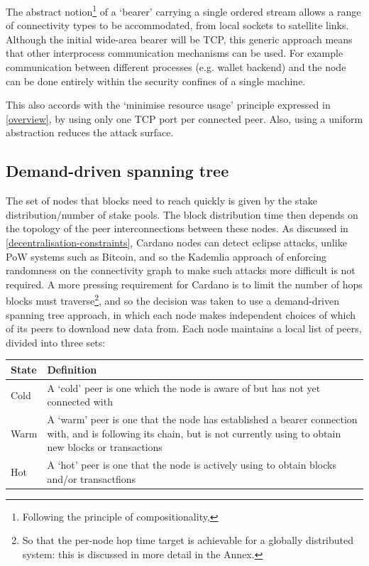\documentclass[11pt,a4paper]{article}
\begin{document}
The abstract notion\footnote{Following the principle of
  compositionality,} of a `bearer' carrying a single ordered stream
allows a range of connectivity types to be accommodated, from local
sockets to satellite links. Although the initial wide-area bearer will
be TCP, this generic approach means that other interprocess
communication mechanisms can be used. For example communication between
different processes (e.g. wallet backend) and the node can be done
entirely within the security confines of a single machine.

This also accords with the `minimise resource usage' principle expressed
in \cref{overview}, by using only one TCP port per connected peer. Also,
using a uniform abstraction reduces the attack surface.

\subsection{Demand-driven spanning tree}
\label{demand-driven-spanning-tree}

The set of nodes that blocks need to reach quickly is given by the stake
distribution/number of stake pools. The block distribution time then
depends on the topology of the peer interconnections between these
nodes. As discussed in
\cref{decentralisation-constraints}, Cardano nodes
can detect eclipse attacks, unlike PoW systems such as Bitcoin, and so
the Kademlia approach of enforcing randomness on the connectivity graph
to make such attacks more difficult is not required. A more pressing
requirement for Cardano is to limit the number of hops blocks must
traverse\footnote{So that the per-node hop time target is achievable for
  a globally distributed system: this is discussed in more detail in the
  Annex.}, and so the decision was taken to use a demand-driven spanning
tree approach, in which each node makes independent choices of which of
its peers to download new data from. Each node maintains a local list of
peers, divided into three sets:

\begin{longtable}[]{lp{10cm}}
\toprule
  \textbf{State} & {\textbf{Definition}}\tabularnewline
\midrule
\endhead
  Cold & A `cold' peer is one which the node is aware of but has not yet
  connected with\tabularnewline
  Warm & A `warm' peer is one that the node has established a bearer
  connection with, and is following its chain, but is not currently using
  to obtain new blocks or transactions\tabularnewline
  Hot & A `hot' peer is one that the node is actively using to obtain
  blocks and/or transactfions\tabularnewline
\bottomrule
\end{longtable}
\end{document}
